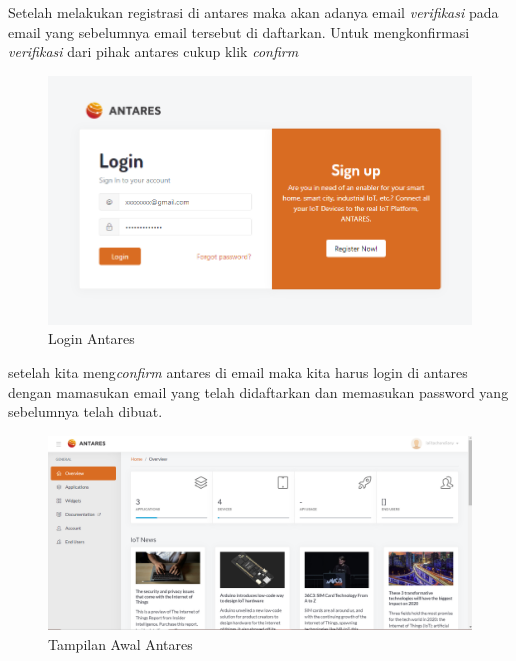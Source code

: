\begin{enumerate}
    \par Setelah melakukan registrasi di antares maka akan adanya email \textit{verifikasi} pada email yang sebelumnya email tersebut di daftarkan. Untuk mengkonfirmasi \textit{verifikasi} dari pihak antares cukup klik \textit{confirm}
    \begin{figure}[H]
    \centering
    \includegraphics[width=1\textwidth]{figures/antares5.png}
    \caption{Login Antares}
    \label{print}
    \end{figure}
    \par setelah kita meng\textit{confirm} antares di email maka kita harus login di antares dengan mamasukan email yang telah didaftarkan dan memasukan password yang sebelumnya telah dibuat.
    
    \begin{figure}[H]
    \centering
    \includegraphics[width=1\textwidth]{figures/antares6.png}
    \caption{Tampilan Awal Antares}
    \label{print}
    \end{figure}
    

\end{enumerate}
